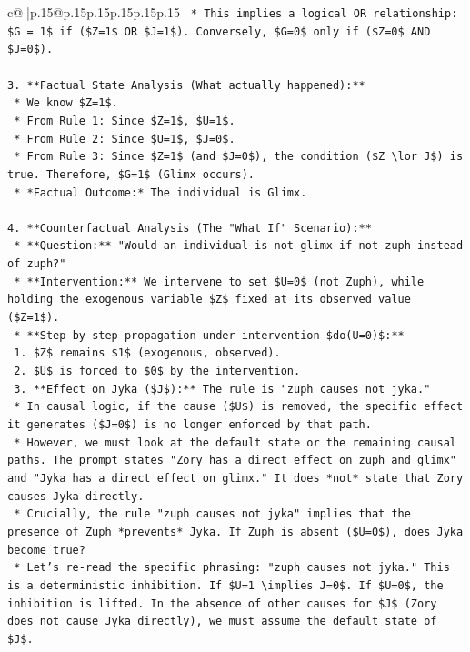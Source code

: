 \documentclass{article}
\begin{document}
{\begin{supertabular}{c@{$\;$}|p{.15\linewidth}@{}p{.15\linewidth}p{.15\linewidth}p{.15\linewidth}p{.15\linewidth}p{.15\linewidth}}
{{{\texttt{        *   This implies a logical OR relationship: \$G = 1\$ if (\$Z=1\$ OR \$J=1\$). Conversely, \$G=0\$ only if (\$Z=0\$ AND \$J=0\$).} \\
\\ 
\texttt{3.  **Factual State Analysis (What actually happened):**} \\
\texttt{    *   We know \$Z=1\$.} \\
\texttt{    *   From Rule 1: Since \$Z=1\$, \$U=1\$.} \\
\texttt{    *   From Rule 2: Since \$U=1\$, \$J=0\$.} \\
\texttt{    *   From Rule 3: Since \$Z=1\$ (and \$J=0\$), the condition (\$Z \textbackslash{}lor J\$) is true. Therefore, \$G=1\$ (Glimx occurs).} \\
\texttt{    *   *Factual Outcome:* The individual is Glimx.} \\
\\ 
\texttt{4.  **Counterfactual Analysis (The "What If" Scenario):**} \\
\texttt{    *   **Question:** "Would an individual is not glimx if not zuph instead of zuph?"} \\
\texttt{    *   **Intervention:** We intervene to set \$U=0\$ (not Zuph), while holding the exogenous variable \$Z\$ fixed at its observed value (\$Z=1\$).} \\
\texttt{    *   **Step{-}by{-}step propagation under intervention \$do(U=0)\$:**} \\
\texttt{        1.  \$Z\$ remains \$1\$ (exogenous, observed).} \\
\texttt{        2.  \$U\$ is forced to \$0\$ by the intervention.} \\
\texttt{        3.  **Effect on Jyka (\$J\$):** The rule is "zuph causes not jyka."} \\
\texttt{            *   In causal logic, if the cause (\$U\$) is removed, the specific effect it generates (\$J=0\$) is no longer enforced by that path.} \\
\texttt{            *   However, we must look at the default state or the remaining causal paths. The prompt states "Zory has a direct effect on zuph and glimx" and "Jyka has a direct effect on glimx." It does *not* state that Zory causes Jyka directly.} \\
\texttt{            *   Crucially, the rule "zuph causes not jyka" implies that the presence of Zuph *prevents* Jyka. If Zuph is absent (\$U=0\$), does Jyka become true?} \\
\texttt{            *   Let's re{-}read the specific phrasing: "zuph causes not jyka." This is a deterministic inhibition. If \$U=1 \textbackslash{}implies J=0\$. If \$U=0\$, the inhibition is lifted. In the absence of other causes for \$J\$ (Zory does not cause Jyka directly), we must assume the default state of \$J\$.} \\
}}}
\end{supertabular}}
\end{document}
